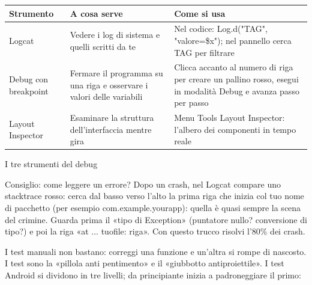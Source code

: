 


\begin{center}
\begin{tabularx}{\linewidth}{|X|X|X|}
\hline
\textbf{Strumento} & \textbf{A cosa serve} & \textbf{Come si usa} \tabularnewline
\hline
Logcat & Vedere i log di sistema e quelli scritti da te & Nel codice: Log.d("TAG", "valore=\$x"); nel pannello cerca TAG per filtrare \tabularnewline
Debug con breakpoint & Fermare il programma su una riga e osservare i valori delle variabili & Clicca accanto al numero di riga per creare un pallino rosso, esegui in modalità Debug e avanza passo per passo \tabularnewline
Layout Inspector & Esaminare la struttura dell'interfaccia mentre gira & Menu Tools Layout Inspector: l'albero dei componenti in tempo reale \tabularnewline
\hline
\end{tabularx}
\end{center}

\begin{center}\small\color{gray}I tre strumenti del debug\end{center}

\begin{tcbinfo}{Consiglio: come leggere un errore?}
Dopo un crash, nel Logcat compare uno stacktrace rosso: cerca dal basso verso l'alto la prima riga che inizia col tuo nome di pacchetto (per esempio com.example.yourapp): quella è quasi sempre la scena del crimine. Guarda prima il «tipo di Exception» (puntatore nullo? conversione di tipo?) e poi la riga «at ... tuofile: riga». Con questo trucco risolvi l'80\% dei crash.

\end{tcbinfo}


I test manuali non bastano: correggi una funzione e un'altra si rompe di nascosto. I test sono la «pillola anti pentimento» e il «giubbotto antiproiettile». I test Android si dividono in tre livelli; da principiante inizia a padroneggiare il primo:

